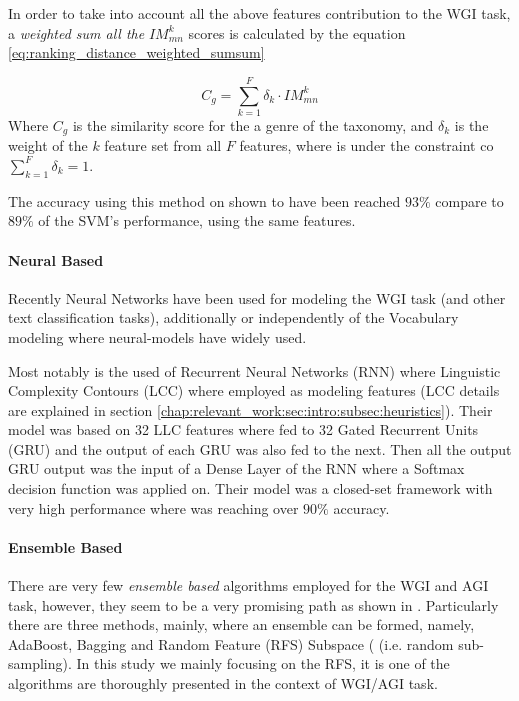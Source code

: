 In order to take into account all the above features contribution to the WGI task, a \textit{weighted sum all the} $IM^{k}_{mn}$ scores is calculated by the equation \ref{eq:ranking_distance_weighted_sumsum}

\begin{equation}\label{eq:ranking_distance_weighted_sumsum}
	C_{g} = \sum_{k=1}^{F} \delta_{k} \cdot IM_{mn}^{k}
\end{equation}
Where $C_{g}$ is the similarity score for the a genre of the taxonomy, and $\delta_{k}$ is the weight of the $k$ feature set from all $F$ features, where is under the constraint co $\sum_{k=1}^{F} \delta_{k} = 1$.

The accuracy using this method on shown to have been reached $93\%$ compare to $89\%$ of the SVM's performance, using the same features.


\paragraph{Neural Based} Recently Neural Networks have been used for modeling the WGI task (and other text classification tasks), additionally or independently of the Vocabulary modeling where neural-models have widely used. 

Most notably is the used of Recurrent Neural Networks (RNN) where Linguistic Complexity Contours (LCC) where employed as modeling features (LCC details are explained in section \ref{chap:relevant_work:sec:intro:subsec:heuristics}). Their model was based on 32 LLC features where fed to 32 Gated Recurrent Units (GRU)  and the output of each GRU was also fed to the next. Then all the output GRU output was the input of a Dense Layer of the RNN where a Softmax decision function was applied on. Their model was a closed-set framework with very high performance where was reaching over $90\%$  accuracy\parencite{strobel2018text}.

\paragraph{Ensemble Based} There are very few \textit{ensemble based} algorithms employed for the WGI and AGI task, however, they seem to be a very promising path as shown in \cite{onan2018ensemble,pritsos2015clef,pritsos2013open,pritsos2018open}. Particularly there are three methods, mainly, where an ensemble can be formed, namely, AdaBoost, Bagging and Random Feature (RFS) Subspace ( (i.e. random sub-sampling). In this study we mainly focusing on the RFS, it is one of the algorithms are thoroughly presented in the context of WGI/AGI task.

